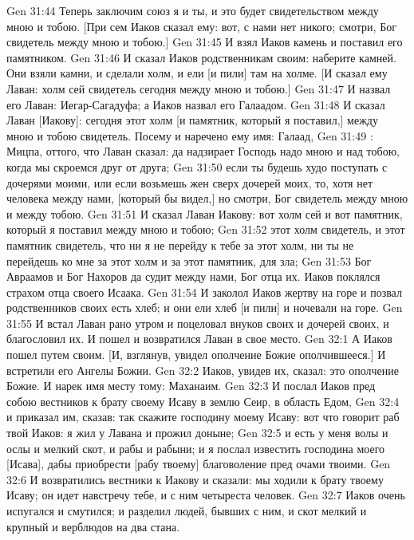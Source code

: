 \vs Gen 31:44 Теперь заключим союз я и ты, и это будет свидетельством между мною и тобою. [При сем Иаков сказал ему: вот, с нами нет никого; смотри, Бог свидетель между мною и тобою.]
\rsbpar\vs Gen 31:45 И взял Иаков камень и поставил его памятником.
\vs Gen 31:46 И сказал Иаков родственникам своим: наберите камней. Они взяли камни, и сделали холм, и ели [и пили] там на холме. [И сказал ему Лаван: холм сей свидетель сегодня между мною и тобою.]
\vs Gen 31:47 И назвал его Лаван: Иегар-Сагадуфа; а Иаков назвал его Галаадом.
\vs Gen 31:48 И сказал Лаван [Иакову]: сегодня этот холм [и памятник, который я поставил,] между мною и тобою свидетель. Посему и наречено ему имя: Галаад,
\vs Gen 31:49 : Мицпа, оттого, что Лаван сказал: да надзирает Господь надо мною и над тобою, когда мы скроемся друг от друга;
\vs Gen 31:50 если ты будешь худо поступать с дочерями моими, или если возьмешь жен сверх дочерей моих, то, хотя нет человека между нами, [который бы видел,] но смотри, Бог свидетель между мною и между тобою.
\vs Gen 31:51 И сказал Лаван Иакову: вот холм сей и вот памятник, который я поставил между мною и тобою;
\vs Gen 31:52 этот холм свидетель, и этот памятник свидетель, что ни я не перейду к тебе за этот холм, ни ты не перейдешь ко мне за этот холм и за этот памятник, для зла;
\vs Gen 31:53 Бог Авраамов и Бог Нахоров да судит между нами, Бог отца их. Иаков поклялся страхом отца своего Исаака.
\vs Gen 31:54 И заколол Иаков жертву на горе и позвал родственников своих есть хлеб; и они ели хлеб [и пили] и ночевали на горе.
\vs Gen 31:55 И встал Лаван рано утром и поцеловал внуков своих и дочерей своих, и благословил их. И пошел и возвратился Лаван в свое место.
\vs Gen 32:1 А Иаков пошел путем своим. [И, взглянув, увидел ополчение Божие ополчившееся.] И встретили его Ангелы Божии.
\vs Gen 32:2 Иаков, увидев их, сказал: это ополчение Божие. И нарек имя месту тому: Маханаим.
\vs Gen 32:3 И послал Иаков пред собою вестников к брату своему Исаву в землю Сеир, в область Едом,
\vs Gen 32:4 и приказал им, сказав: так скажите господину моему Исаву: вот что говорит раб твой Иаков: я жил у Лавана и прожил доныне;
\vs Gen 32:5 и есть у меня волы и ослы и мелкий скот, и рабы и рабыни; и я послал известить  господина моего [Исава], дабы приобрести [рабу твоему] благоволение пред очами твоими.
\vs Gen 32:6 И возвратились вестники к Иакову и сказали: мы ходили к брату твоему Исаву; он идет навстречу тебе, и с ним четыреста человек.
\vs Gen 32:7 Иаков очень испугался и смутился; и разделил людей, бывших с ним, и скот мелкий и крупный и верблюдов на два стана.
